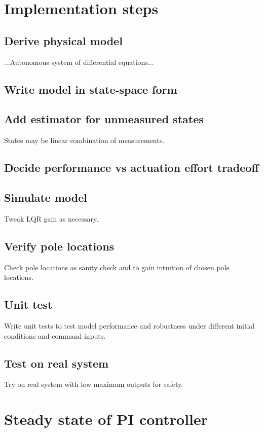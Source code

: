 \documentclass[10pt,conference,compsoc]{IEEEtran}
\begin{document}
\section{Implementation steps}

\subsection{Derive physical model}

\noindent ...Autonomous system of differential equations...

\subsection{Write model in state-space form}

\subsection{Add estimator for unmeasured states}

\noindent States may be linear combination of measurements.

\subsection{Decide performance vs actuation effort tradeoff}

\subsection{Simulate model}

\noindent Tweak LQR gain as necessary.

\subsection{Verify pole locations}

\noindent Check pole locations as sanity check and to gain intuition of chosen pole locations.

\subsection{Unit test}

\noindent Write unit tests to test model performance and robustness under different initial
conditions and command inputs.


\subsection{Test on real system}

\noindent Try on real system with low maximum outputs for safety.

\appendix

\section{Steady state of PI controller}





\glsaddall
\printglossaries
\end{document}
